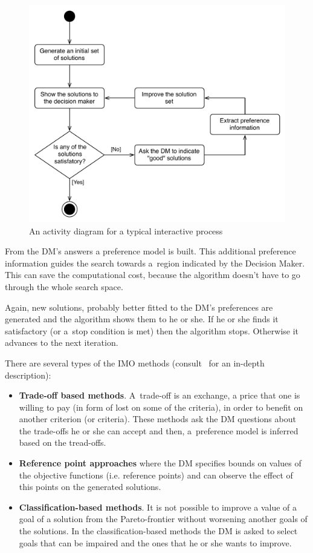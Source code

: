 \begin{figure}
  \centering \includegraphics[scale=0.65]{img/imoprocess_uml}
  \caption{An activity diagram for a typical interactive process}
  \label{imoprocess_uml}
\end{figure}

From the DM's answers a preference model is built. This additional preference
information guides the search towards a~region indicated by the Decision
Maker. This can save the computational cost, because the algorithm doesn't
have to go through the whole search space.

Again, new solutions, probably better fitted to the DM's preferences are
generated and the algorithm shows them to he or she. If he or she finds it
satisfactory (or a~stop condition is met) then the algorithm stops. Otherwise
it advances to the next iteration.

There are several types of the IMO methods (consult~\cite{MRW08} for an
in-depth description):
\begin{itemize}
\item \textbf{Trade-off based methods}. A~trade-off is an exchange, a price that
  one is willing to pay (in form of lost on some of the criteria), in order to
  benefit on another criterion (or criteria). These methods ask the DM
  questions about the trade-offs he or she can accept and then, a~preference
  model is inferred based on the tread-offs.
\item \textbf{Reference point approaches} where the DM specifies bounds on
  values of the objective functions (i.e. reference points) and can observe
  the effect of this points on the generated solutions.
\item \textbf{Classification-based methods}. It is not possible to improve a
  value of a goal of a solution from the Pareto-frontier without worsening
  another goals of the solutions. In the classification-based methods the DM
  is asked to select goals that can be impaired and the ones that he or she
  wants to improve.
\end{itemize}

